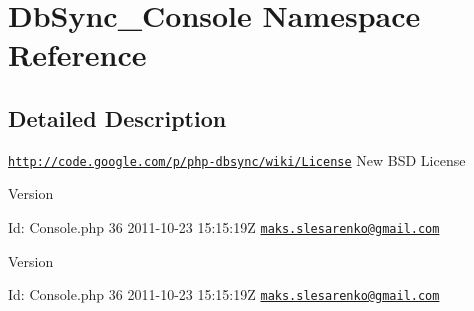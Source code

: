 \hypertarget{namespaceDbSync__Console}{
\section{DbSync\_\-Console Namespace Reference}
\label{namespaceDbSync__Console}
}


\subsection{Detailed Description}
\href{http://code.google.com/p/php-dbsync/wiki/License}{\tt http://code.google.com/p/php-\/dbsync/wiki/License} New BSD License \begin{DoxyVersion}{Version}

\end{DoxyVersion}
\begin{DoxyParagraph}{Id:}
Console.php 36 2011-\/10-\/23 15:15:19Z \href{mailto:maks.slesarenko@gmail.com}{\tt maks.slesarenko@gmail.com} 
\end{DoxyParagraph}


\begin{DoxyVersion}{Version}

\end{DoxyVersion}
\begin{DoxyParagraph}{Id:}
Console.php 36 2011-\/10-\/23 15:15:19Z \href{mailto:maks.slesarenko@gmail.com}{\tt maks.slesarenko@gmail.com} 
\end{DoxyParagraph}
